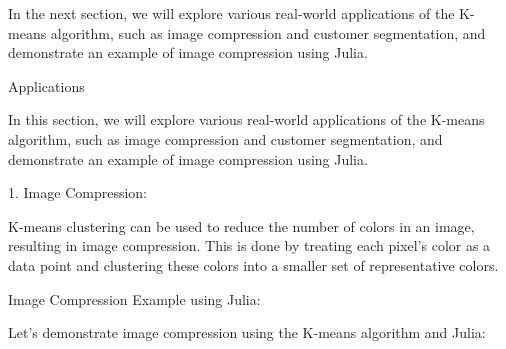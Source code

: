 \documentclass[11pt]{article}
\begin{document}
    In the next section, we will explore various real-world applications of
the K-means algorithm, such as image compression and customer
segmentation, and demonstrate an example of image compression using
Julia.

    {Applications}

    In this section, we will explore various real-world applications of the
K-means algorithm, such as image compression and customer segmentation,
and demonstrate an example of image compression using Julia.

    {1. Image Compression:}

K-means clustering can be used to reduce the number of colors in an
image, resulting in image compression. This is done by treating each
pixel's color as a data point and clustering these colors into a smaller
set of representative colors.

    {Image Compression Example using Julia:}

Let's demonstrate image compression using the K-means algorithm and
Julia:
\end{document}
